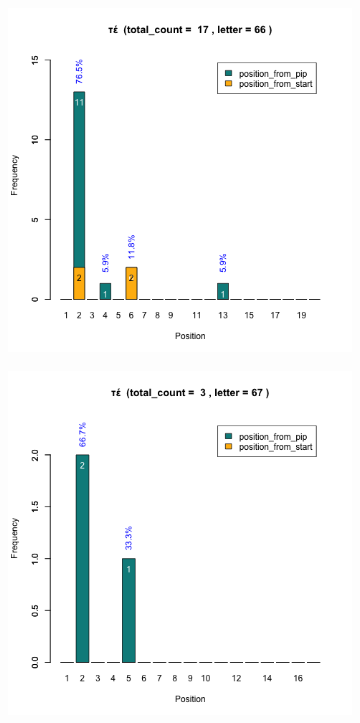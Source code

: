 \documentclass[a4paper]{article}
\begin{document}
\begin{figure}
\begin{subfigure}{0.45\textwidth}
\centering
\includegraphics[width=1\linewidth]{../../data/output/paul_R_par/plots/par9_lt66.png}
\end{subfigure}
\begin{subfigure}{0.45\textwidth}
\centering
\includegraphics[width=1\linewidth]{../../data/output/paul_R_par/plots/par9_lt67.png}

\end{subfigure}
\end{figure}
\end{document}
